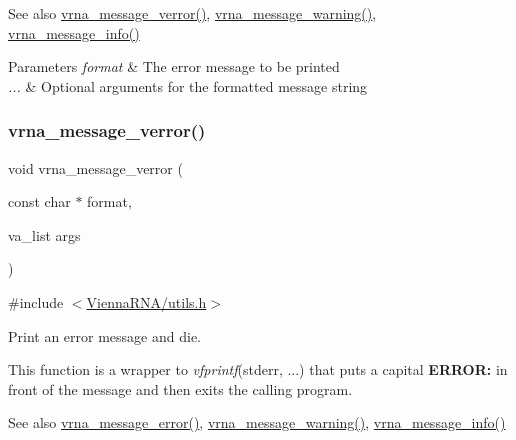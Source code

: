 \begin{DoxySeeAlso}{See also}
\hyperlink{group__utils_gabc1a08dea0d84b5c33701732172a8b18}{vrna\+\_\+message\+\_\+verror()}, \hyperlink{group__utils_ga6e07ed24add60693ba886d54d0a46635}{vrna\+\_\+message\+\_\+warning()}, \hyperlink{group__utils_ga039bae6153a6415b054dbe6045f83d03}{vrna\+\_\+message\+\_\+info()}
\end{DoxySeeAlso}

\begin{DoxyParams}{Parameters}
{\em format} & The error message to be printed \\
\hline
{\em ...} & Optional arguments for the formatted message string \\
\hline
\end{DoxyParams}
\mbox{\label{group__utils_gabc1a08dea0d84b5c33701732172a8b18}} 
\subsubsection{\texorpdfstring{vrna\+\_\+message\+\_\+verror()}{vrna\_message\_verror()}}
{\footnotesize\ttfamily void vrna\+\_\+message\+\_\+verror (\begin{DoxyParamCaption}\item[{const char $\ast$}]{format,  }\item[{va\+\_\+list}]{args }\end{DoxyParamCaption})}



{\ttfamily \#include $<$\hyperlink{utils_8h}{Vienna\+R\+N\+A/utils.\+h}$>$}



Print an error message and die. 

This function is a wrapper to {\itshape vfprintf}(stderr, ...) that puts a capital {\bfseries E\+R\+R\+OR\+:} in front of the message and then exits the calling program.

\begin{DoxySeeAlso}{See also}
\hyperlink{group__utils_ga36b35be01d7f36cf7f59c245eee628d1}{vrna\+\_\+message\+\_\+error()}, \hyperlink{group__utils_ga6e07ed24add60693ba886d54d0a46635}{vrna\+\_\+message\+\_\+warning()}, \hyperlink{group__utils_ga039bae6153a6415b054dbe6045f83d03}{vrna\+\_\+message\+\_\+info()}
\end{DoxySeeAlso}

